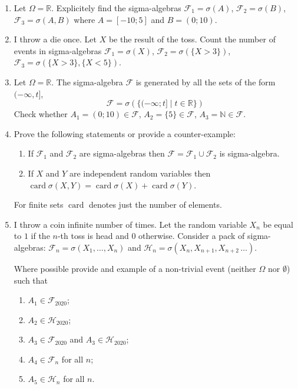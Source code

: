 \documentclass[12pt]{article}
\DeclareMathOperator{\card}{card}
\newcommand \RR{\mathbb{R}}
\newcommand \NN{\mathbb{N}}
\newcommand{\cF}{\mathcal{F}}
\newcommand{\cH}{\mathcal{H}}
\begin{document}
\begin{enumerate}
  \item Let $\Omega = \RR$. Explicitely find the sigma-algebras $\cF_1 = \sigma(A)$, $\cF_2 = \sigma(B)$, $\cF_3 = \sigma(A, B)$ where $A=[-10;5]$ and $B=(0;10)$.
  \item I throw a die once. Let $X$ be the result of the toss. 
  Count the number of events in sigma-algebras $\cF_1 =\sigma (X)$, $\cF_2 = \sigma (\{X>3\})$, $\cF_3 = \sigma (\{X > 3\}, \{X<5\})$.

  \item Let $\Omega = \RR$. The sigma-algebra $\cF$ is generated by all the sets of the form $(-\infty, t]$,
  \[
  \cF = \sigma \left( \{ (-\infty; t] \mid t \in \RR\} \right)  
  \]
  Check whether $A_1 = (0; 10) \in \cF$, $A_2 = \{5\} \in \cF$, $A_3 = \NN \in \cF$. 

  \item Prove the following statements or provide a counter-example:
  \begin{enumerate}
    \item If $\cF_1$ and $\cF_2$ are sigma-algebras then $\cF = \cF_1 \cup \cF_2$ is sigma-algebra.
    \item If $X$ and $Y$ are independent random variables then $\card \sigma(X, Y) = \card \sigma(X) + \card \sigma(Y)$.
  \end{enumerate}

  For finite sets $\card$ denotes just the number of elements.

  \item I throw a coin infinite number of times. 
  Let the random variable $X_n$ be equal to $1$ if the $n$-th toss is head and $0$ otherwise. 
  Consider a pack of sigma-algebras: $\cF_n = \sigma (X_1, \ldots, X_n)$ and $\cH_n = \sigma (X_n, X_{n+1}, X_{n+2}\, \ldots)$.

  Where possible provide and example of a non-trivial event (neither $\Omega$ nor $\emptyset$) such that 
  \begin{enumerate}
    \item $A_1 \in \cF_{2020}$;
    \item $A_2 \in \cH_{2020}$;
    \item $A_3 \in \cF_{2020}$ and $A_3 \in \cH_{2020}$;
    \item $A_4 \in \cF_n$ for all $n$; 
    \item $A_5 \in \cH_n$ for all $n$.
  \end{enumerate}

\end{enumerate}
\end{document}
